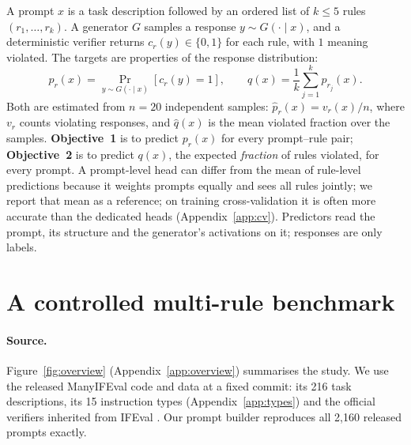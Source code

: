 \documentclass{article}
\newcommand{\phat}{\hat{p}}
\newcommand{\qhat}{\hat{q}}
\begin{document}
A prompt $x$ is a task description followed by an ordered list of $k\le 5$ rules $(r_1,\dots,r_k)$. A generator $G$
samples a response $y\sim G(\cdot\mid x)$, and a deterministic verifier returns $c_r(y)\in\{0,1\}$ for each rule, with
$1$ meaning violated. The targets are properties of the response distribution:
\begin{equation}
p_r(x)=\Pr_{y\sim G(\cdot\mid x)}\!\left[c_r(y)=1\right],\qquad q(x)=\frac{1}{k}\sum_{j=1}^{k}p_{r_j}(x).
\label{eq:targets}
\end{equation}
Both are estimated from $n=20$ independent samples: $\phat_r(x)=v_r(x)/n$, where $v_r$ counts violating responses,
and $\qhat(x)$ is the mean violated fraction over the samples. \textbf{Objective~1} is to predict $p_r(x)$ for every
prompt--rule pair; \textbf{Objective~2} is to predict $q(x)$, the expected \emph{fraction} of rules violated, for every
prompt. A prompt-level head can differ from the mean of rule-level predictions because it weights prompts equally and
sees all rules jointly; we report that mean as a reference; on training cross-validation it is often more accurate than the dedicated
heads (Appendix~\ref{app:cv}). Predictors read the prompt, its structure and the generator's activations on it; responses are only labels.

\section{A controlled multi-rule benchmark}
\label{sec:data}



\paragraph{Source.} Figure~\ref{fig:overview} (Appendix~\ref{app:overview}) summarises the study. We use the released ManyIFEval code and data \citep{harada2025instructions} at a fixed commit: its
216 task descriptions, its 15 instruction types (Appendix~\ref{app:types}) and the official verifiers inherited from
IFEval \citep{zhou2023ifeval}. Our prompt builder reproduces all 2,160 released prompts exactly.
\end{document}
